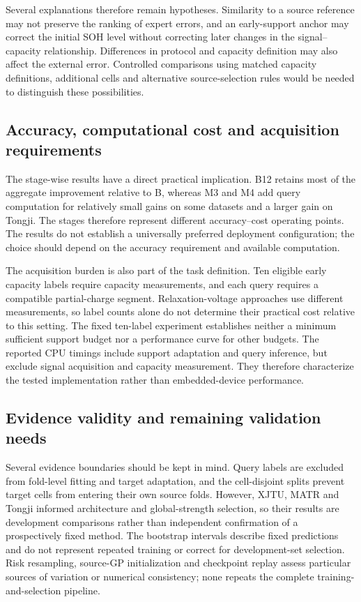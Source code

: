 \documentclass[preprint,12pt]{elsarticle}
\begin{document}
Several explanations therefore remain hypotheses. Similarity to a source reference may not preserve the ranking of expert errors, and an early-support anchor may correct the initial SOH level without correcting later changes in the signal--capacity relationship. Differences in protocol and capacity definition may also affect the external error. Controlled comparisons using matched capacity definitions, additional cells and alternative source-selection rules would be needed to distinguish these possibilities.

\subsection{Accuracy, computational cost and acquisition requirements}
The stage-wise results have a direct practical implication. B12 retains most of the aggregate improvement relative to B, whereas M3 and M4 add query computation for relatively small gains on some datasets and a larger gain on Tongji. The stages therefore represent different accuracy--cost operating points. The results do not establish a universally preferred deployment configuration; the choice should depend on the accuracy requirement and available computation.

The acquisition burden is also part of the task definition. Ten eligible early capacity labels require capacity measurements, and each query requires a compatible partial-charge segment. Relaxation-voltage approaches \citep{zhu2022,zhao2025} use different measurements, so label counts alone do not determine their practical cost relative to this setting. The fixed ten-label experiment establishes neither a minimum sufficient support budget nor a performance curve for other budgets. The reported CPU timings include support adaptation and query inference, but exclude signal acquisition and capacity measurement. They therefore characterize the tested implementation rather than embedded-device performance.

\subsection{Evidence validity and remaining validation needs}
Several evidence boundaries should be kept in mind. Query labels are excluded from fold-level fitting and target adaptation, and the cell-disjoint splits prevent target cells from entering their own source folds. However, XJTU, MATR and Tongji informed architecture and global-strength selection, so their results are development comparisons rather than independent confirmation of a prospectively fixed method. The bootstrap intervals describe fixed predictions and do not represent repeated training or correct for development-set selection. Risk resampling, source-GP initialization and checkpoint replay assess particular sources of variation or numerical consistency; none repeats the complete training-and-selection pipeline.
\end{document}
